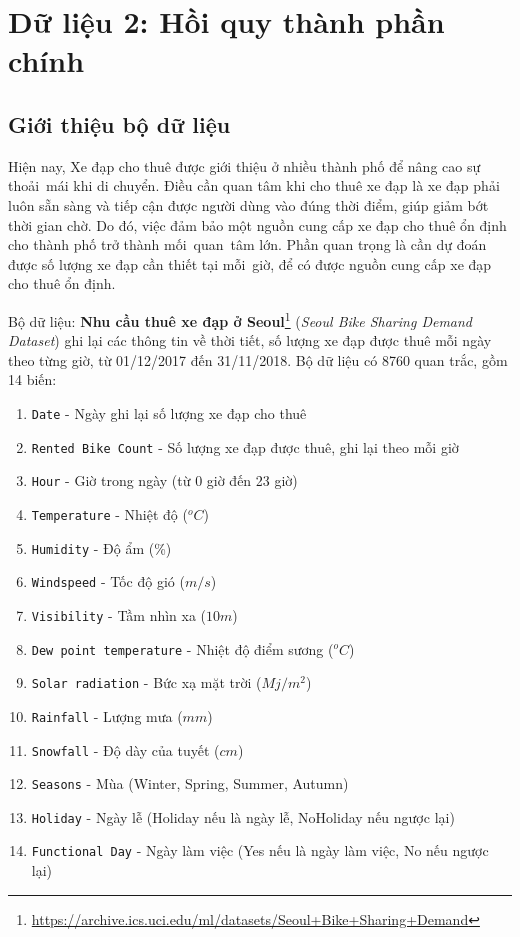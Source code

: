 \section{Dữ liệu 2: Hồi quy thành phần chính}

\subsection*{Giới thiệu bộ dữ liệu}
Hiện nay, Xe đạp cho thuê được giới thiệu ở nhiều thành phố để nâng cao sự thoải~mái khi di chuyển. Điều cần quan tâm khi cho thuê xe đạp là xe đạp phải luôn sẵn sàng và tiếp cận được người dùng vào đúng thời điểm, giúp giảm bớt thời gian chờ. Do đó, việc đảm bảo một nguồn cung cấp xe đạp cho thuê ổn định cho thành phố trở thành mối~quan~tâm lớn. Phần quan trọng là cần dự đoán được số lượng xe đạp cần thiết tại mỗi~giờ, để có được nguồn cung cấp xe đạp cho thuê ổn định.

Bộ dữ liệu: \textbf{Nhu cầu thuê xe đạp ở Seoul}\footnote{\url{https://archive.ics.uci.edu/ml/datasets/Seoul+Bike+Sharing+Demand}} ({\textit{Seoul Bike Sharing Demand Dataset}}) ghi lại các thông tin về thời tiết, số lượng xe đạp được thuê mỗi ngày theo từng giờ, từ 01/12/2017 đến 31/11/2018. Bộ dữ liệu có 8760 quan trắc, gồm 14 biến:
\begin{enumerate}
	\item \texttt{Date} - Ngày ghi lại số lượng xe đạp cho thuê
	\item \texttt{Rented Bike Count} - Số lượng xe đạp được thuê, ghi lại theo mỗi giờ
	\item \texttt{Hour} - Giờ trong ngày (từ 0 giờ đến 23 giờ)
	\item \texttt{Temperature} - Nhiệt độ ($^o C$)
	\item \texttt{Humidity} - Độ ẩm (\%)
	\item \texttt{Windspeed} - Tốc độ gió ($m/s$)
	\item \texttt{Visibility} - Tầm nhìn xa ($10m$)
	\item \texttt{Dew point temperature} - Nhiệt độ điểm sương ($^o C$)
	\item \texttt{Solar radiation} - Bức xạ mặt trời ($Mj/m^2$)
	\item \texttt{Rainfall} - Lượng mưa ($mm$)
	\item \texttt{Snowfall} - Độ dày của tuyết ($cm$)
	\item \texttt{Seasons} - Mùa (Winter, Spring, Summer, Autumn)
	\item \texttt{Holiday} - Ngày lễ (Holiday nếu là ngày lễ, NoHoliday nếu ngược lại)
	\item \texttt{Functional Day} - Ngày làm việc (Yes nếu là ngày làm việc, No nếu ngược lại)
\end{enumerate}

